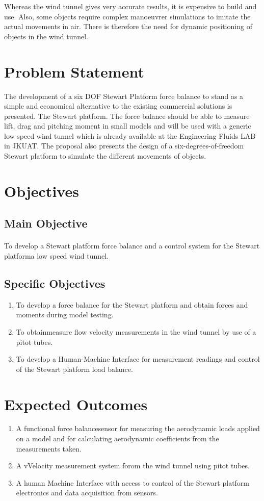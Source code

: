 Whereas the wind tunnel gives very accurate results, it is expensive to build and use. Also, some objects require complex manoeuvrer simulations to imitate the actual movements in air. There is therefore the need for dynamic positioning of objects in the wind tunnel.
\section{Problem Statement}
 The development of a six DOF Stewart Platform force balance to stand as a simple and economical alternative to the existing commercial solutions is presented. The Stewart platform. The force balance should be able to measure lift, drag and pitching moment in small models and will be used with a generic low speed wind tunnel which is already available at the Engineering Fluids LAB in JKUAT. The proposal also presents the design of a six-degrees-of-freedom Stewart platform to simulate the different movements of objects.
\section{Objectives}
\subsection{Main Objective}
\paragraph{} To develop a Stewart platform force balance and a control system for the Stewart platforma low speed wind tunnel. 
\subsection{Specific Objectives}
\begin{enumerate}
\item To develop a force balance for the Stewart platform and obtain forces and moments during model testing.
\item To obtainmeasure flow velocity measurements in the wind tunnel by use of a pitot tubes.
\item To develop a Human-Machine Interface for measurement readings and control of the Stewart platform load balance.
\end{enumerate}
\section{Expected Outcomes}
\begin{enumerate}
\item A functional force balancesensor for measuring the aerodynamic loads applied on a model
and for calculating aerodynamic coefficients from the measurements taken.
\item A vVelocity measurement system forom the wind tunnel using pitot tubes.
\item A human Machine Interface with access to control of the Stewart platform electronics
and data acquisition from sensors.
\end{enumerate}
